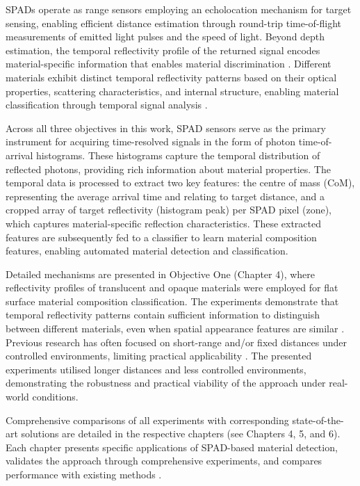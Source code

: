 \documentclass[12pt,a4paper,oneside]{report}
\begin{document}
SPADs operate as range sensors employing an echolocation mechanism for target sensing, enabling efficient distance estimation through round-trip time-of-flight measurements of emitted light pulses and the speed of light. Beyond depth estimation, the temporal reflectivity profile of the returned signal encodes material-specific information that enables material discrimination \cite{su2016,becker2023,tafone2023}. Different materials exhibit distinct temporal reflectivity patterns based on their optical properties, scattering characteristics, and internal structure, enabling material classification through temporal signal analysis \cite{su2016,becker2023,tafone2023,yang2024}.

Across all three objectives in this work, SPAD sensors serve as the primary instrument for acquiring time-resolved signals in the form of photon time-of-arrival histograms. These histograms capture the temporal distribution of reflected photons, providing rich information about material properties. The temporal data is processed to extract two key features: the centre of mass (CoM), representing the average arrival time and relating to target distance, and a cropped array of target reflectivity (histogram peak) per SPAD pixel (zone), which captures material-specific reflection characteristics. These extracted features are subsequently fed to a classifier to learn material composition features, enabling automated material detection and classification.

Detailed mechanisms are presented in Objective One (Chapter 4), where reflectivity profiles of translucent and opaque materials were employed for flat surface material composition classification. The experiments demonstrate that temporal reflectivity patterns contain sufficient information to distinguish between different materials, even when spatial appearance features are similar \cite{su2016,becker2023,tafone2023}. Previous research has often focused on short-range and/or fixed distances under controlled environments, limiting practical applicability \cite{su2016}. The presented experiments utilised longer distances and less controlled environments, demonstrating the robustness and practical viability of the approach under real-world conditions.

Comprehensive comparisons of all experiments with corresponding state-of-the-art solutions are detailed in the respective chapters (see Chapters 4, 5, and 6). Each chapter presents specific applications of SPAD-based material detection, validates the approach through comprehensive experiments, and compares performance with existing methods \cite{yang2024,tafone2023,becker2023}.
\end{document}
